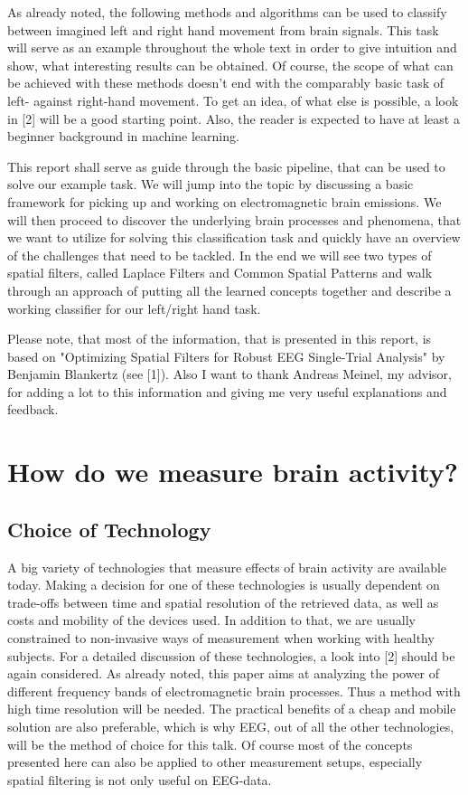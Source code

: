 \documentclass[12pt,twoside,twocolumn]{article}
\begin{document}
As already noted, the following methods and algorithms can be used to classify between imagined left and right hand movement from brain signals. This task will serve as an example throughout the whole text in order to give intuition and show, what interesting results can be obtained. Of course, the scope of what can be achieved with these methods doesn't end with the comparably basic task of left- against right-hand movement. To get an idea, of what else is possible, a look in [2] will be a good starting point. Also, the reader is expected to have at least a beginner background in machine learning.

This report shall serve as guide through the basic pipeline, that can be used to solve our example task. We will jump into the topic by discussing a basic framework for picking up and working on electromagnetic brain emissions. We will then proceed to discover the underlying brain processes and phenomena, that we want to utilize for solving this classification task and quickly have an overview of the challenges that need to be tackled. In the end we will see two types of spatial filters, called Laplace Filters and Common Spatial Patterns and walk through an approach of putting all the learned concepts together and describe a working classifier for our left/right hand task. 

Please note, that most of the information, that is presented in this report, is based on "Optimizing Spatial Filters for Robust
EEG Single-Trial Analysis" by Benjamin Blankertz (see [1]). Also I want to thank Andreas Meinel, my advisor, for adding a lot to this information and giving me very useful explanations and feedback.

\section{How do we measure brain activity?}
\subsection{Choice of Technology}
A big variety of technologies that measure effects of brain activity are available today. Making a decision for one of these technologies is usually dependent on trade-offs between time and spatial resolution of the retrieved data, as well as costs and mobility of the devices used. In addition to that, we are usually constrained to non-invasive ways of measurement when working with healthy subjects. For a detailed discussion of these technologies, a look into [2] should be again considered.
As already noted, this paper aims at analyzing the power of different frequency bands of electromagnetic brain processes. Thus a method with high time resolution will be needed. The practical benefits of a cheap and mobile solution are also preferable, which is why EEG, out of all the other technologies, will be the method of choice for this talk. Of course most of the concepts presented here can also be applied to other measurement setups, especially spatial filtering is not only useful on EEG-data.
\end{document}
